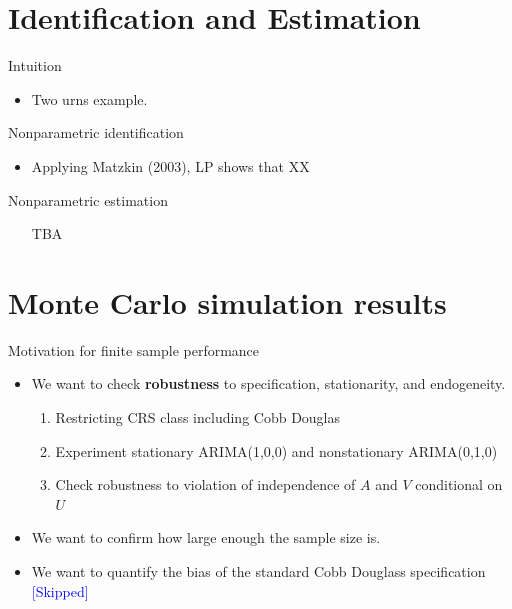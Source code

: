 \documentclass[aspectratio=169]{beamer}
\begin{document}
\section{Identification and Estimation}

\begin{frame}{Intuition}
    \begin{itemize}
    \item Two urns example.
    \end{itemize}
\end{frame}

\begin{frame}{Nonparametric identification}
    \begin{itemize}
    \item Applying Matzkin (2003), LP shows that XX
    \end{itemize}
\end{frame}

\begin{frame}{Nonparametric estimation}
    \begin{itemize}
    \item [TBA]
    \end{itemize}
\end{frame}



\section{Monte Carlo simulation results}

\begin{frame}{Motivation for finite sample performance}
\begin{itemize}
    \item We want to check \textbf{robustness} to specification, stationarity, and endogeneity.
    \begin{enumerate}
        \item Restricting CRS class including Cobb Douglas
        \item Experiment stationary ARIMA(1,0,0) and nonstationary ARIMA(0,1,0)
        \item Check robustness to violation of independence of $A$ and $V$ conditional on $U$
    \end{enumerate}
    \item We want to confirm how large enough the sample size is.
    \item We want to quantify the bias of the standard Cobb Douglass specification \textcolor{blue}{[Skipped]}
\end{itemize}
    
\end{frame}
\end{document}
